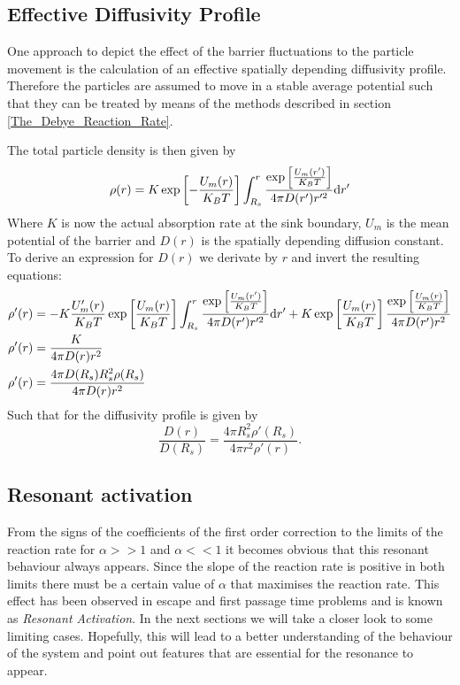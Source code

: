 \subsection{Effective Diffusivity Profile}
One approach to depict the effect of the barrier fluctuations to the particle movement is the calculation of an effective spatially depending diffusivity profile. Therefore the particles are assumed to move in a stable average potential such that they can be treated by means of the methods described in section \ref{The_Debye_Reaction_Rate}.\par
The total particle density is then given by
\begin{equation}
    \rho(r) = K\exp \left[ -\frac{U_m(r)}{K_B T} \right] \int_{R_s}^{r} \frac{\exp \left[ \frac{U_m(r')}{K_B T}\right]}{4 \pi D(r')r'^2} {\rm d} r'
\end{equation}
Where $K$ is now the actual absorption rate at the sink boundary, $U_m$ is the mean potential of the barrier and $D(r)$ is the spatially depending diffusion constant. To derive an expression for $D(r)$ we derivate by $r$ and invert the resulting equations:
\begin{align*}
    \rho'(r) &= -K\frac{U'_m(r)}{K_B T}\exp \left[ \frac{U_m(r)}{K_B T} \right] \int_{R_s}^{r} \frac{\exp \left[ \frac{U_m(r')}{K_B T}\right]}{4 \pi D(r')r'^2} {\rm d} r' + K \exp\left[ \frac{U_m(r)}{K_B T} \right] \frac{\exp \left[ \frac{U_m(r)}{K_B T}\right]}{4 \pi D(r')r^2} \\
\rho'(r) &= \frac{K}{4 \pi D(r) r^2} \\
\rho'(r) &= \frac{4 \pi D(R_s) R_s^2 \rho(R_s)}{4 \pi D(r) r^2}
\end{align*}
Such that for the diffusivity profile is given by
\begin{equation}
    \frac{D(r)}{D(R_s)} = \frac{4 \pi R_s^2 \rho'(R_s)}{ 4 \pi r^2 \rho'(r)}.
    \label{spatial_diffusivity_profile}
\end{equation}


\subsection{Resonant activation}
From the signs of the coefficients of the first order correction to the limits of the reaction rate for $\alpha>>1$ and $\alpha<<1$ it becomes obvious that this resonant behaviour always appears. Since the slope of the reaction rate is positive in both limits there must be a certain value of $\alpha$ that maximises the reaction rate. This effect has been observed in escape and first passage time problems and is known as \textit{Resonant Activation}.
In the next sections we will take a closer look to some limiting cases. Hopefully, this will lead to a better understanding of the behaviour of the system and point out features that are essential for the resonance to appear.

